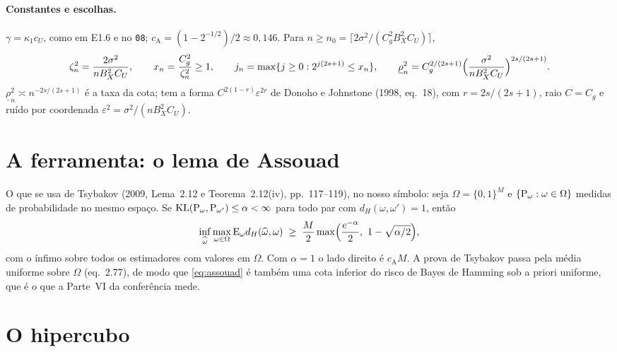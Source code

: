 \documentclass[11pt,a4paper]{article}
\newcommand{\dH}{d_{H}}
\newcommand{\rlow}{\underline{\rho}_{n}}
\newcommand{\cA}{c_{\mathrm{A}}}
\newcommand{\KL}{\operatorname{KL}}
\begin{document}
\paragraph{Constantes e escolhas.} $\gamma = \kappa_{1}c_{U}$, como em E1.6
e no \texttt{08}; $\cA = (1 - 2^{-1/2})/2 \approx 0{,}146$. Para $n \ge
n_{0} = \lceil 2\sigma^{2}/(C_{g}^{2}B_{X}^{2}C_{U})\rceil$,
\begin{equation}
  \label{eq:escolhas}
  \zeta_{n}^{2} = \frac{2\sigma^{2}}{nB_{X}^{2}C_{U}},
  \qquad
  x_{n} = \frac{C_{g}^{2}}{\zeta_{n}^{2}} \ge 1,
  \qquad
  \lev_{n} = \max\{\lev \ge 0 : 2^{\lev(2s+1)} \le x_{n}\},
  \qquad
  \rlow^{2} = C_{g}^{2/(2s+1)}\Bigl(\frac{\sigma^{2}}{nB_{X}^{2}C_{U}}\Bigr)^{2s/(2s+1)} .
\end{equation}
$\rlow^{2} \asymp n^{-2s/(2s+1)}$ é a taxa da cota; tem a forma
$C^{2(1-r)}\varepsilon^{2r}$ de Donoho e Johnstone (1998, eq.~18), com $r =
2s/(2s+1)$, raio $C = C_{g}$ e ruído por coordenada $\varepsilon^{2} =
\sigma^{2}/(nB_{X}^{2}C_{U})$.

\section{A ferramenta: o lema de Assouad}

O que se usa de Tsybakov (2009, Lema~2.12 e Teorema~2.12(iv),
pp.~117--119), no nosso símbolo: seja $\Omega = \{0,1\}^{M}$ e
$\{\mathrm{P}_{\omega} : \omega\in\Omega\}$ medidas de probabilidade no mesmo
espaço. Se $\KL(\Prob_{\omega},\Prob_{\omega'}) \le \alpha < \infty$ para todo
par com $\dH(\omega,\omega') = 1$, então
\begin{equation}
  \label{eq:assouad}
  \inf_{\widehat\omega}\max_{\omega\in\Omega}\E_{\omega}\dH(\widehat\omega,\omega)
  \;\ge\; \frac{M}{2}\max\Bigl(\frac{e^{-\alpha}}{2},\ 1 - \sqrt{\alpha/2}\Bigr),
\end{equation}
com o ínfimo sobre todos os estimadores com valores em $\Omega$. Com
$\alpha = 1$ o lado direito é $\cA M$. A prova de Tsybakov passa pela média
uniforme sobre $\Omega$ (eq.~2.77), de modo que \eqref{eq:assouad} é também
uma cota inferior do risco de Bayes de Hamming sob a priori uniforme, que é o
que a Parte~VI da conferência mede.

\section{O hipercubo}
\end{document}
